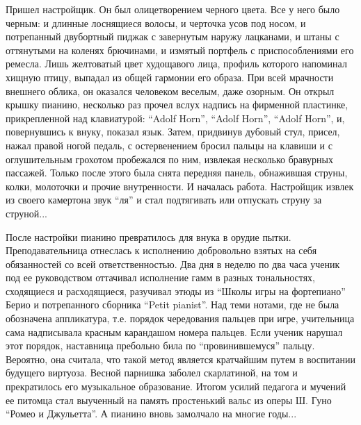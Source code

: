 Пришел настройщик. Он был олицетворением черного цвета. Все у него было черным:
и длинные лоснящиеся волосы, и черточка усов под носом, и потрепанный
двубортный пиджак с завернутым наружу лацканами, и штаны с оттянутыми на
коленях брючинами, и измятый портфель с приспособлениями его ремесла. Лишь
желтоватый цвет худощавого лица, профиль которого напоминал хищную птицу,
выпадал из общей гармонии его образа. При всей мрачности внешнего облика, он
оказался человеком веселым, даже озорным. Он открыл крышку пианино, несколько
раз прочел вслух надпись на фирменной пластинке, прикрепленной над клавиатурой:
\enquote{Adolf Horn}, \enquote{Adolf Horn}, \enquote{Adolf Horn}, и, повернувшись к внуку, показал
язык. Затем, придвинув дубовый стул, присел, нажал правой ногой педаль, с
остервенением бросил пальцы на клавиши и с оглушительным грохотом пробежался по
ним, извлекая несколько бравурных пассажей. Только после этого была снята
передняя панель, обнажившая струны, колки, молоточки и прочие внутренности. И
началась работа. Настройщик извлек из своего камертона звук \enquote{ля} и стал
подтягивать или отпускать струну за струной... 

После настройки пианино превратилось для внука в орудие пытки.
Преподавательница отнеслась к исполнению добровольно взятых на себя
обязанностей со всей ответственностью. Два дня в неделю по два часа  ученик под
ее руководством оттачивал исполнение гамм в разных тональностях, сходящиеся и
расходящиеся, разучивал этюды из \enquote{Школы игры на фортепиано} Берио и
потрепанного сборника \enquote{Petit pianist}. Над теми  нотами, где не была обозначена
аппликатура, т.е. порядок чередования пальцев при игре, учительница сама
надписывала красным карандашом номера пальцев. Если ученик нарушал этот
порядок, наставница пребольно била по \enquote{провинившемуся} пальцу. Вероятно, она
считала, что такой метод является кратчайшим путем в воспитании будущего
виртуоза. Весной парнишка заболел скарлатиной, на том и прекратилось его
музыкальное образование. Итогом усилий педагога и мучений ее питомца стал
выученный на память простенький вальс из оперы Ш. Гуно \enquote{Ромео и Джульетта}. А
пианино вновь замолчало на многие годы...
